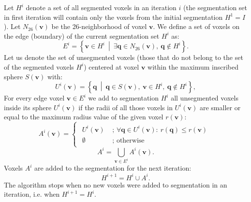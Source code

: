 \documentclass[review]{elsarticle}
\begin{document}
Let $H^i$ denote a set of all segmented voxels in an iteration $i$ (the
segmentation set in first iteration will contain only the voxels from the
initial segmentation  $H^1 = I$).
Let $N_{26}(\mathbf{v})$ be the 26-neighborhood of voxel $\mathbf{v}$.  We
define a set of voxels on the edge (boundary) of the current segmentation set
$H^i$ as:
\begin{equation}
  \label{eq:boundary}
E^i = \left\{ \mathbf{v} \in H^i \ \middle| \ \exists \mathbf{q} \in N_{26}(\mathbf{v}),\ \mathbf{q} \notin H^i \right\} .
\end{equation}
Let us denote the set of unsegmented voxels (those that do not belong to the
set of the segmented voxels $H^i$) centered at voxel $\mathbf{v}$ within the
maximum inscribed sphere $S(\mathbf{v})$ with:
\begin{equation}
  \label{eq:sphere_unseg}
  U^i(\mathbf{v}) = \left\{ \mathbf{q} \ \middle| \ 
  \mathbf{q} \in S(\mathbf{v}),\ \mathbf{v} \in H^i,\ \mathbf{q} \notin H^i \right\}, 
\end{equation}
For every edge voxel $\mathbf{v} \in E^i$ we add to segmentation $H^i$ all
unsegmented voxels inside its sphere $U^i(\mathbf{v})$ if the radii of all
those voxels in $U^i(\mathbf{v})$ are smaller or equal to the maximum radius
value of the given voxel $r(\mathbf{v})$:
\begin{equation}
  \label{eq:addition_criteria}
  A^i \left( \mathbf{v}\right) = \left\{
    \begin{matrix}
      \begin{split}
        U^i(\mathbf{v}) & \textrm{ ;   } \forall \mathbf{q} \in U^i(\mathbf{v}): \ r(\mathbf{q}) \leq r(\mathbf{v}) \\
        \emptyset & \textrm{ ;   otherwise }
      \end{split}
    \end{matrix}\right. 
\end{equation}
\begin{equation}
  \label{eq:decreasing_toadd}
  A^i = \bigcup_{\mathbf{v} \in E^i}  A^i \left( \mathbf{v}\right).
\end{equation}
Voxels $A^i$ are added to the segmentation for the next iteration:
\begin{equation}
  \label{eq:decreasing_nextiter}
  H^{i+1} = H^i \cup A^i .
\end{equation}
The algorithm stops when no new voxels were added to segmentation in an iteration, i.e.
when $H^{i+1} = H^i$.
\end{document}
